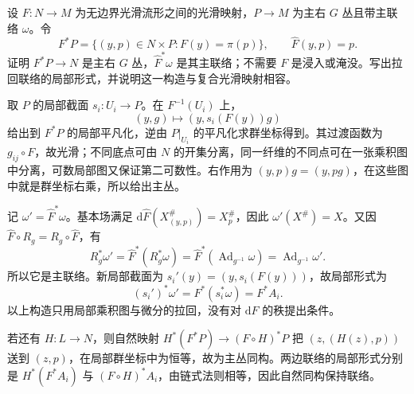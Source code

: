 \begin{exercise}\label{g1:ex:pullback-principal-connection}
	设 \(F:N\to M\) 为无边界光滑流形之间的光滑映射，\(P\to M\) 为主右 \(G\) 丛且带主联络 \(\omega\)。令
	\[
		F^*P=\{(y,p)\in N\times P:F(y)=\pi(p)\},\qquad
		\widehat F(y,p)=p.
	\]
	证明 \(F^*P\to N\) 是主右 \(G\) 丛，\(\widehat F^*\omega\) 是其主联络；不需要 \(F\) 是浸入或淹没。写出拉回联络的局部形式，并说明这一构造与复合光滑映射相容。
\end{exercise}
\begin{solution}
	取 \(P\) 的局部截面 \(s_i:U_i\to P\)。在 \(F^{-1}(U_i)\) 上，
	\[
		(y,g)\longmapsto(y,s_i(F(y))g)
	\]
	给出到 \(F^*P\) 的局部平凡化，逆由 \(P|_{U_i}\) 的平凡化求群坐标得到。其过渡函数为 \(g_{ij}\circ F\)，故光滑；不同底点可由 \(N\) 的开集分离，同一纤维的不同点可在一张乘积图中分离，可数局部图又保证第二可数性。右作用为 \((y,p)g=(y,pg)\)，在这些图中就是群坐标右乘，所以给出主丛。

	记 \(\omega'=\widehat F^*\omega\)。基本场满足 \(\mathrm{d}\widehat F(X^\#_{(y,p)})=X^\#_p\)，因此 \(\omega'(X^\#)=X\)。又因 \(\widehat F\circ R_g=R_g\circ\widehat F\)，有
	\[
		R_g^*\omega'=\widehat F^*(R_g^*\omega)
		=\widehat F^*(\operatorname{Ad}_{g^{-1}}\omega)
		=\operatorname{Ad}_{g^{-1}}\omega'.
	\]
	所以它是主联络。新局部截面为 \(s_i'(y)=(y,s_i(F(y)))\)，故局部形式为
	\[
		(s_i')^*\omega'=F^*(s_i^*\omega)=F^*A_i.
	\]
	以上构造只用局部乘积图与微分的拉回，没有对 \(\mathrm{d}F\) 的秩提出条件。

	若还有 \(H:L\to N\)，则自然映射 \(H^*(F^*P)\to(F\circ H)^*P\) 把 \((z,(H(z),p))\) 送到 \((z,p)\)，在局部群坐标中为恒等，故为主丛同构。两边联络的局部形式分别是 \(H^*(F^*A_i)\) 与 \((F\circ H)^*A_i\)，由链式法则相等，因此自然同构保持联络。
\end{solution}

